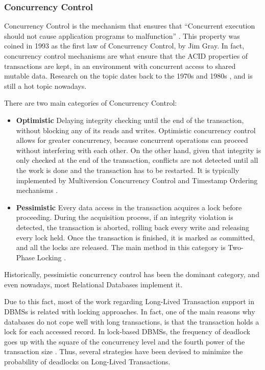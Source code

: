 \documentclass{llncs}
\begin{document}
\subsubsection{Concurrency Control}

Concurrency Control is the mechanism that ensures that ``Concurrent
execution should not cause application programs to malfunction''
\cite{reuter1993transaction}. This property was coined in 1993 as the
first law of Concurrency Control, by Jim Gray. In fact, concurrency
control mechanisms are what ensure that the ACID properties of
transactions are kept, in an environment with concurrent access to
shared mutable data. Research on the topic dates back to the 1970s
\cite{rosenkrantz1978system} and 1980s \cite{gray1981transaction}, and
is still a hot topic nowadays.

There are two main categories of Concurrency Control:

\begin{itemize}

\item {\bf Optimistic} Delaying integrity checking until the end of
  the transaction, without blocking any of its reads and writes.
  Optimistic concurrency control allows for greater concurrency,
  because concurrent operations can proceed without interfering with
  each other. On the other hand, given that integrity is only checked
  at the end of the transaction, conflicts are not detected until all
  the work is done and the transaction has to be restarted. It is
  typically implemented by Multiversion Concurrency Control and
  Timestamp Ordering mechanisms \cite{Bernstein1981}.

\item {\bf Pessimistic} Every data access in the transaction acquires
  a lock before proceeding. During the acquisition process, if an
  integrity violation is detected, the transaction is aborted, rolling
  back every write and releasing every lock held. Once the transaction
  is finished, it is marked as committed, and all the locks are
  released. The main method in this category is Two-Phase Locking
  \cite{Bernstein1981}.

\end{itemize}

Historically, pessimistic concurrency control has been the dominant
category, and even nowadays, most Relational Databases implement it.

Due to this fact, most of the work regarding Long-Lived Transaction
support in DBMSs is related with locking approaches. In fact, one of
the main reasons why databases do not cope well with long
transactions, is that the transaction holds a lock for each accessed
record. In lock-based DBMSs, the frequency of deadlock goes up with
the square of the concurrency level and the fourth power of the
transaction size \cite{gray1981transaction}. Thus, several strategies
have been devised to minimize the probability of deadlocks on
Long-Lived Transactions.
\end{document}
